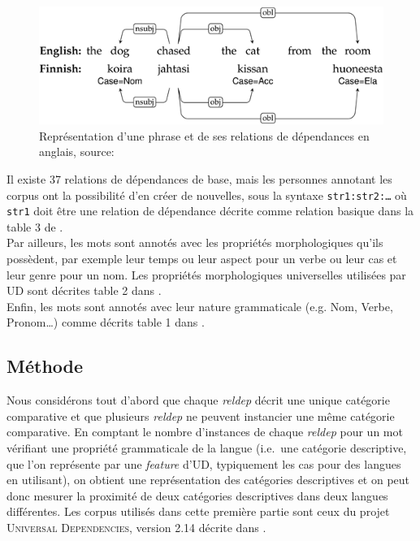 \documentclass{cours}
\begin{document}
\begin{figure}[H]
	\centering
	\includegraphics[width=\textwidth]{Figures/Visualisations/simplified_ud_annotation}
	\caption{Représentation d'une phrase et de ses relations de dépendances en anglais, source:\cite{UDv2}}
\end{figure}

Il existe 37 relations de dépendances de base, mais les personnes annotant les corpus ont la possibilité d'en créer de nouvelles, sous la syntaxe \texttt{str1:str2:\dots} où \texttt{str1} doit être une relation de dépendance décrite comme relation basique dans la table 3 de \cite{UDv2}.\\
Par ailleurs, les mots sont annotés avec les propriétés morphologiques qu'ils possèdent, par exemple leur temps ou leur aspect pour un verbe ou leur cas et leur genre pour un nom.
Les propriétés morphologiques universelles utilisées par UD sont décrites table 2 dans \cite{UDv2}.\\
Enfin, les mots sont annotés avec leur nature grammaticale (e.g. Nom, Verbe, Pronom\dots) comme décrits table 1 dans \cite{UDv2}.

\subsection{Méthode}\label{subsec:méthode}
Nous considérons tout d'abord que chaque \textit{reldep} décrit une unique catégorie comparative et que plusieurs \textit{reldep} ne peuvent instancier une même catégorie comparative.
En comptant le nombre d'instances de chaque \textit{reldep} pour un mot vérifiant une propriété grammaticale de la langue (i.e.\ une catégorie descriptive, que l'on représente par une \textit{feature} d'UD, typiquement les cas pour des langues en utilisant), on obtient une représentation des catégories descriptives et on peut donc mesurer la proximité de deux catégories descriptives dans deux langues différentes.
Les corpus utilisés dans cette première partie sont ceux du projet \textsc{Universal Dependencies}, version 2.14 décrite dans \cite{UD214}.
\end{document}
